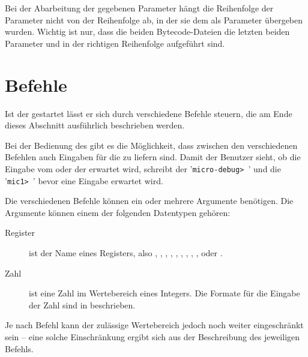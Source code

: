 Bei der Abarbeitung der gegebenen Parameter hängt die Reihenfolge der Parameter nicht von der Reihenfolge ab, in der sie dem \md{} als Parameter übergeben wurden. Wichtig ist nur, dass die beiden Bytecode-Dateien die letzten beiden Parameter und in der richtigen Reihenfolge aufgeführt sind.

\section{Befehle}
Ist der \md{} gestartet lässt er sich durch verschiedene Befehle steuern, die am Ende dieses Abschnitt ausführlich beschrieben werden.

Bei der Bedienung des \md{} gibt es die Möglichkeit, dass zwischen den verschiedenen Befehlen auch Eingaben für die \mic{} zu liefern sind. Damit der Benutzer sieht, ob die Eingabe vom \md{} oder der \mic{} erwartet wird, schreibt der \md{} '\texttt{micro-debug> }' und die \mic{} '\texttt{mic1> }' bevor eine Eingabe erwartet wird.

Die verschiedenen Befehle können ein oder mehrere Argumente benötigen. Die Argumente können einem der folgenden Datentypen gehören:
\begin{description}
\item[Register] ist der Name eines Registers, also , , , , , , , , ,  oder .
\item[Zahl] ist eine Zahl im Wertebereich eines Integers. Die Formate für die Eingabe der Zahl sind in  beschrieben.
\end{description}

Je nach Befehl kann der zulässige Wertebereich jedoch noch weiter eingeschränkt sein -- eine solche Einschränkung ergibt sich aus der Beschreibung des jeweiligen Befehls.

